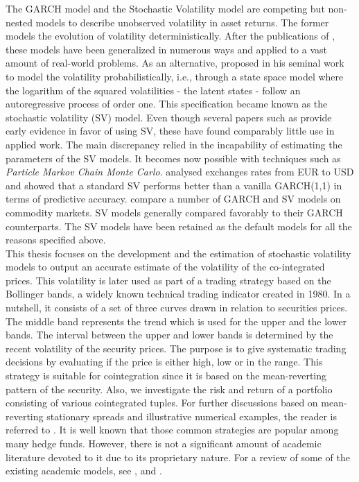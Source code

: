 \documentclass[11pt,a4,twosided,singlespacing,titlepagenumber=on]{scrreprt}
\numberwithin{equation}{chapter} %
\theoremstyle{remark}
\begin{document}
The GARCH model and the Stochastic Volatility model are competing but non-nested models to describe unobserved volatility in asset returns. The former models the evolution of volatility deterministically. After the publications of \cite{engle1986}, these models have been generalized in numerous ways and applied to a vast amount of real-world problems. As an alternative, \cite{taylor1982} proposed in his seminal work to model the volatility probabilistically, i.e., through a state space model where the logarithm of the squared volatilities - the latent states - follow an autoregressive process of order one. This specification became known as the stochastic volatility (SV) model. Even though several papers such as \cite{kim1998} provide early evidence in favor of using SV, these have found comparably little use in applied work. The main discrepancy relied in the incapability of estimating the parameters of the SV models. It becomes now possible with techniques such as \textit{Particle Markov Chain Monte Carlo}. \cite{kastner2014} analysed exchanges rates from EUR to USD and showed that a standard SV performs better than a vanilla GARCH(1,1) in terms of predictive accuracy. \cite{chan2015} compare a number of GARCH and SV models on commodity markets. SV models generally compared favorably to their GARCH counterparts. The SV models have been retained as the default models for all the reasons specified above. \\


This thesis focuses on the development and the estimation of stochastic volatility models to output an accurate estimate of the volatility of the co-integrated prices. This volatility is later used as part of a trading strategy based on the Bollinger bands, a widely known technical trading indicator created in 1980. In a nutshell, it consists of a set of three curves drawn in relation to securities prices. The middle band represents the trend which is used for the upper and the lower bands. The interval between the upper and lower bands is determined by the recent volatility of the security prices. The purpose is to give systematic trading decisions by evaluating if the price is either high, low or in the range. This strategy is suitable for cointegration since it is based on the mean-reverting pattern of the security. Also, we investigate the risk and return of a portfolio consisting of various cointegrated tuples. For further discussions based on mean-reverting stationary spreads and illustrative numerical examples, the reader is referred to \cite{vidyamurthy2004}.  It is well known that those common strategies are popular among many hedge funds. However, there is not a significant amount of academic literature devoted to it due to its proprietary nature. For a review of some of the existing academic models, see \cite{gatev2006}, \cite{perlin2009} and \cite{broussard2012}.
\end{document}
